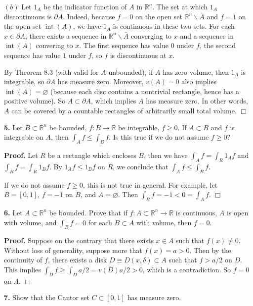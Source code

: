 \documentclass{article}
\begin{document}
$(b)$ Let $1_A$ be the indicator function of $A$ in $\mathbb{R}^n$. The
set at which $1_A$ discontinuous is $\partial A$. Indeed, because $f= 0$
on the open set $\mathbb{R}^n \backslash \bar{A}$ and $f = 1$ on the
open set $\operatorname{int}(A)$, we have $1_A$ is continuous in these
two sets. For each $x\in \partial A$, there exists a sequence in
$\mathbb{R}^n \backslash \bar{A}$ converging to $x$ and a sequence in
$\operatorname{int}(A)$ convering to $x$. The first sequence has value
$0$ under $f$, the second sequence has value $1$ under $f$, so $f$ is
discontinuous at $x$.

By Theorem 8.3 (with valid for $A$ unbounded), if $A$ has zero volume,
then $1_A$ is integrable, so $\partial A$ has measure zero. Moreover,
$v(A) = 0$ also implies $\operatorname{int}(A) = \varnothing$ (because
each disc contains a nontrivial rectangle, hence has a positive volume).
So $A \subset \partial A$, which implies $A$ has measure zero. In other
words, $A$ can be covered by a countable rectangles of arbitrarily small
total volume. $\Box$

    \textbf{5.} Let $B\subset \mathbb{R}^n$ be bounded, $f:B\to \mathbb{R}$
be integrable, $f\ge 0$. If $A\subset B$ and $f$ is integrable on $A$,
then $\int_A f \le \int_B f$. Is this true if we do not assume
$f \ge 0$?

    \textbf{Proof.} Let $R$ be a rectangle which encloses $B$, then we have
$\int_A f = \int_R 1_A f$ and $\int_B f = \int_R 1_B f$. By
$1_A f \le 1_B f$ on $R$, we conclude that $\int_A f \le \int_B f$.

If we do not assume $f \ge 0$, this is not true in general. For example,
let $B = [0,1]$, $f = -1$ on $B$, and $A = \varnothing$. Then
$\int_B f = -1 < 0 = \int_A f$. $\Box$

    \textbf{6.} Let $A\subset \mathbb{R}^n$ be bounded. Prove that if
$f :A\subset \mathbb{R}^n \to \mathbb{R}$ is continuous, $A$ is open
with volume, and $\int_B f = 0$ for each $B\subset A$ with volume, then
$f = 0$.

    \textbf{Proof.} Suppose on the contrary that there exists $x \in A$ such
that $f(x) \ne 0$. Without loss of generality, suppose more that
$f(x) = a > 0$. Then by the continuity of $f$, there exists a disk
$D\equiv D(x,\delta) \subset A$ such that $f > a/2$ on $D$. This implies
$\int_D f \ge \int_D a/2 = v(D)a/2 > 0$, which is a contradiction. So
$f = 0$ on $A$. $\Box$

    \textbf{7.} Show that the Cantor set $C \subset [0,1]$ has measure zero.
\end{document}
